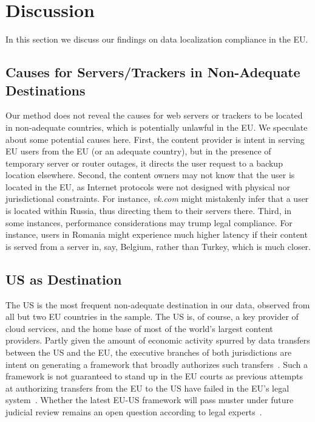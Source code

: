 \section{Discussion}
In this section we discuss our findings on data localization compliance
in the EU.

\subsection{Causes for Servers/Trackers in Non-Adequate Destinations}
Our method does not reveal the causes for web servers or trackers to be located in 
non-adequate countries, which is potentially unlawful in the EU.
We speculate about some potential causes here.
First, the content provider is intent in serving EU users from the EU (or an adequate country),
but in the presence of temporary server or router outages, it directs the user request to a backup
location elsewhere.
Second, the content owners may not know that the user is located in the EU,
as Internet protocols were not designed with physical nor jurisdictional constraints.
For instance, \textit{vk.com} might mistakenly infer that a user is located within Russia, thus
directing them to their servers there.
Third, in some instances, performance considerations may trump legal compliance.
For instance, users in Romania might experience much higher latency if their
content is served from a server in, say, Belgium, rather than Turkey, which is much closer.

\subsection{US as Destination}
The US is the most frequent non-adequate destination in our data,
observed from all but two EU countries in the sample.
The US is, of course, a key provider of cloud services,
and the home base of most of the world's largest content providers.
Partly given the amount of economic activity spurred by data transfers
between the US and the EU, the executive branches of both jurisdictions are intent on generating a
framework that broadly authorizes such transfers~\cite{EUUSData30:online,FACTSHEE89:online}. 
Such a framework is not guaranteed to stand up in the EU courts as previous attempts at
authorizing transfers from the EU to the US have failed in the EU's legal system~\cite{ThirdTim84:online}.
Whether the latest
EU-US framework will pass muster under future judicial review remains an open question
according to legal experts~\cite{ceps}.

